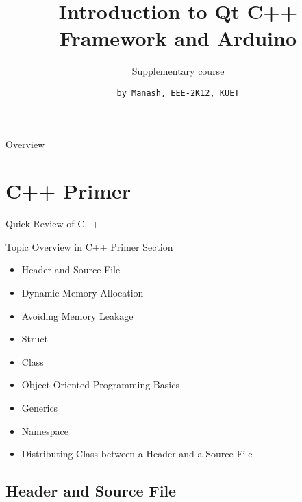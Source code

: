 \documentclass[newPxFont]{beamer}
\title{Introduction to Qt C++ Framework and Arduino}
\subtitle{Supplementary course}
\date{}
\author{\texttt{by Manash, EEE-2K12, KUET}}
\institute{\textit{Khulna University of Engineering \& Technology}}
\begin{document}
%
%

\maketitle


\begin{frame}{Overview}
    \tableofcontents
\end{frame}



%
%

\section{C++ Primer}


\begin{frame}[allowframebreaks]{Quick Review of C++}


\begin{block}{Topic Overview in C++ Primer Section}
	\begin{itemize}
	    \item Header and Source File
		\item Dynamic Memory Allocation 
		\item Avoiding Memory Leakage
		\item Struct
		\item Class
		\item Object Oriented Programming Basics
		\item Generics
		\item Namespace
		\item Distributing Class between a Header and a Source File
	\end{itemize}
\end{block}

\end{frame}


\subsection{Header and Source File}
\end{document}
